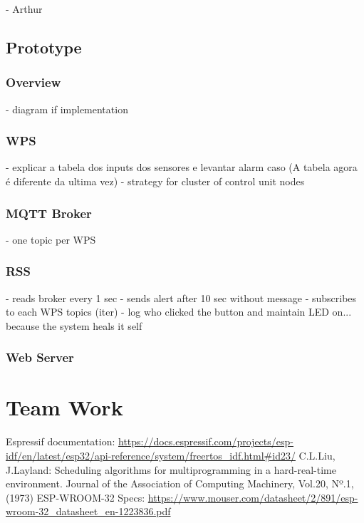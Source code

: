 \documentclass[11pt]{article}
\begin{document}
- Arthur

\subsection{Prototype}

\subsubsection{Overview}

- diagram if implementation

\subsubsection{WPS}

- explicar a tabela dos inputs dos sensores e levantar alarm caso (A tabela agora é diferente da ultima vez)
- strategy for cluster of control unit nodes

\subsubsection{MQTT Broker}

- one topic per WPS

\subsubsection{RSS}

- reads broker every 1 sec
- sends alert after 10 sec without message
- subscribes to each WPS topics (iter)
- log who clicked the button and maintain LED on... because the system heals it self 

\subsubsection{Web Server}

\section{Team Work}


\newpage
\begin{thebibliography}{8}

 Espressif documentation: {\url{https://docs.espressif.com/projects/esp-idf/en/latest/esp32/api-reference/system/freertos_idf.html#id23/}}
  C.L.Liu, J.Layland: Scheduling algorithms for multiprogramming in a hard-real-time environment. Journal of the Association of Computing Machinery, Vol.20, Nº.1, (1973)
 ESP-WROOM-32 Specs:  {\url{https://www.mouser.com/datasheet/2/891/esp-wroom-32_datasheet_en-1223836.pdf}}

\end{thebibliography}
\end{document}
